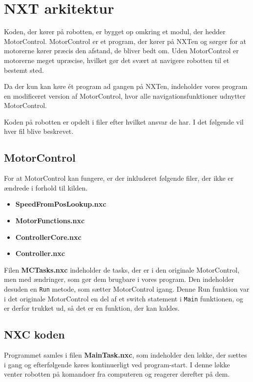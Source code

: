 \section{NXT arkitektur}
Koden, der kører på robotten, er bygget op omkring et modul, der hedder MotorControl. \cite{MotorControl}
MotorControl er et program, der kører på NXTen og sørger for at motorerne kører præcis den afstand, de bliver bedt om. 
Uden MotorControl er motorerne meget upræcise, hvilket gør det svært at navigere robotten til et bestemt sted.

Da der kun kan køre ét program ad gangen på NXTen, indeholder vores program en modificeret version af MotorControl, hvor alle navigationsfunktioner udnytter MotorControl.

Koden på robotten er opdelt i filer efter hvilket ansvar de har.
I det følgende vil hver fil blive beskrevet.

\subsection{MotorControl}
For at MotorControl kan fungere, er der inkluderet følgende filer, der ikke er ændrede i forhold til kilden.

\begin{itemize}
\item \textbf{SpeedFromPosLookup.nxc}
\item \textbf{MotorFunctions.nxc}
\item \textbf{ControllerCore.nxc}
\item \textbf{Controller.nxc}
\end{itemize}

Filen \textbf{MCTasks.nxc} indeholder de tasks, der er i den originale MotorControl, men med ændringer, som gør dem brugbare i vores program.
Den indeholder desuden en \lstinline[style=c]!Run! metode, som sætter MotorControl igang. 
Denne Run funktion var i det originale MotorControl en del af et switch statement i \lstinline[style=c]!Main! funktionen, og er derfor trukket ud, så det er en funktion, der kan kaldes.

\subsection{NXC koden}

Programmet samles i filen \textbf{MainTask.nxc}, som indeholder den løkke, der sættes i gang og efterfølgende køres kontinuerligt ved program-start. 
I denne løkke venter robotten på komandoer fra computeren og reagerer derefter på dem.


